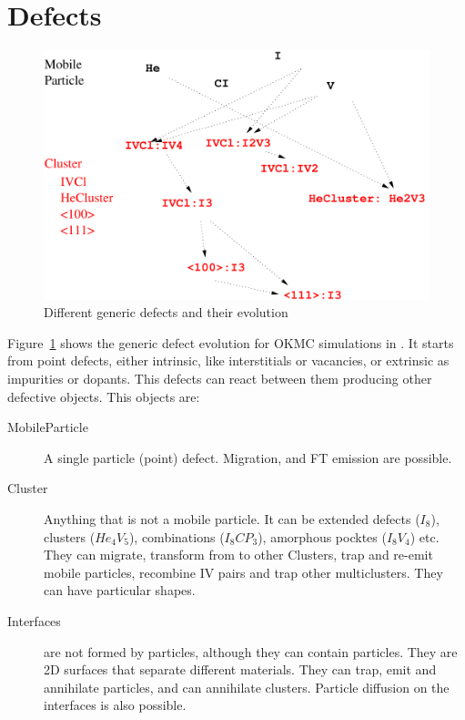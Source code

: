 \section{Defects}

\begin{figure}
\includegraphics[width=12cm]{images/defect-evolution}
\caption{Different generic defects and their evolution}
\label{fig:defects-evolution}
\end{figure}

Figure~\ref{fig:defects-evolution} shows the generic defect evolution for OKMC simulations in  \MMonCa{}. It starts from point defects, either intrinsic, like interstitials or vacancies, or extrinsic as impurities or dopants. This defects can react between them producing other defective objects. This objects are:
\begin{description}
\item[MobileParticle] A single particle (point) defect. Migration,  and FT emission are possible. 
\item[Cluster] Anything that is not a mobile particle. It can be extended defects ($I_8$), clusters ($He_4V_5$), combinations ($I_8CP_3$), amorphous pocktes ($I_8V_4$) etc. They can migrate, transform from to other Clusters, trap and re-emit mobile particles, recombine IV pairs and trap other multiclusters. They can have particular shapes. 
\item[Interfaces]  are not formed by particles, although they can contain particles. They are 2D surfaces that separate different materials. They can trap, emit and annihilate particles, and can annihilate clusters. Particle diffusion on the interfaces is also possible.
\end{description}

